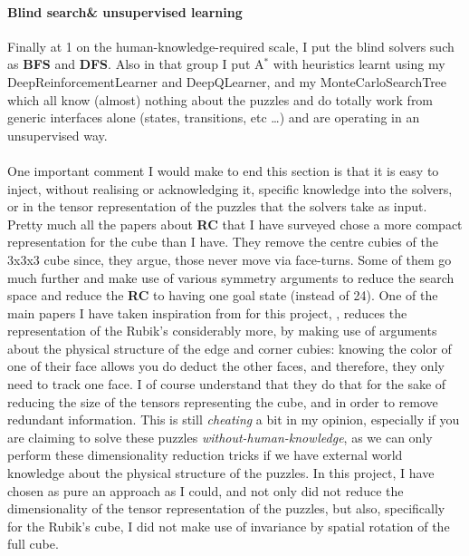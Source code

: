 \paragraph{Blind search\& unsupervised learning}
Finally at 1 on the human-knowledge-required scale, I put the blind solvers such as \textbf{BFS} and \textbf{DFS}. Also in that group I put A$^{*}$ with heuristics learnt using my DeepReinforcementLearner and DeepQLearner, and my MonteCarloSearchTree which all know (almost) nothing about the puzzles and do totally work from generic interfaces alone (states, transitions, etc \dots) and are operating in an unsupervised way.
\\
\\
One important comment I would make to end this section is that it is easy to inject, without realising or acknowledging it, specific knowledge into the solvers, or in the tensor representation of the puzzles that the solvers take as input. Pretty much all the papers about \textbf{RC} that I have surveyed chose a more compact representation for the cube than I have. They remove the centre cubies of the 3x3x3 cube since, they argue, those never move via face-turns. Some of them go much further and make use of various symmetry arguments to reduce the search space and reduce the \textbf{RC} to having one goal state (instead of 24). One of the main papers I have taken inspiration from for this project, \cite{DBLP:journals/corr/abs-1805-07470}, reduces the representation of the Rubik's considerably more, by making use of arguments about the physical structure of the edge and corner cubies: knowing the color of one of their face allows you do deduct the other faces, and therefore, they only need to track one face. I of course understand that they do that for the sake of reducing the size of the tensors representing the cube, and in order to remove redundant information. This is still \textit{cheating} a bit in my opinion, especially if you are claiming to solve these puzzles \textit{without-human-knowledge}, as we can only perform these dimensionality reduction tricks if we have external world knowledge about the physical structure of the puzzles. In this project, I have chosen as pure an approach as I could, and not only did not reduce the dimensionality of the tensor representation of the puzzles, but also, specifically for the Rubik's cube, I did not make use of invariance by spatial rotation of the full cube.



































